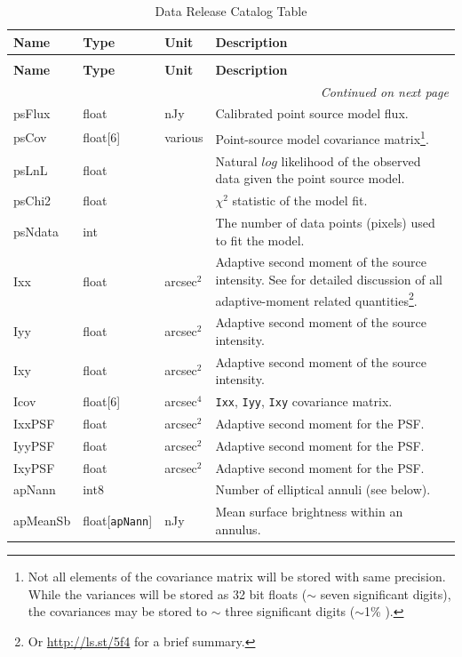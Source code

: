 \documentclass[SE,lsstdraft,toc]{lsstdoc}
\newenvironment{schema}[3]{%
\setlength\LTleft{0pt}
\setlength\LTright{\fill}
\begin{longtable}{p{0.2\textwidth}p{0.14\textwidth}p{0.14\textwidth}p{0.41\textwidth}}

\caption[#1]{#2\label{#3}}\\

\hline \textbf{Name} & \textbf{Type} & \textbf{Unit} & \textbf{Description}\\ \hline
\endfirsthead

\caption[#1]{#2}\\

\hline \textbf{Name} & \textbf{Type} & \textbf{Unit} & \textbf{Description}\\ \hline
\endhead

\hline \multicolumn{4}{r}{\emph{Continued on next page}} \\
\endfoot

\hline\hline
\endlastfoot
}{%
\hline
\end{longtable}
}
\begin{document}
\begin{schema}{\Source Table}{Data Release Catalog \Source Table}{tbl:sourceTable}
psFlux & float & nJy & Calibrated point source model flux.\\

psCov & float[6] & various & Point-source model covariance matrix\footnote{Not all elements of the covariance matrix will be stored with same precision. While the variances will be stored as 32 bit floats ($\sim$ seven significant digits), the covariances may be stored to $\sim$ three significant digits ($\sim$1\% ).}. \\

psLnL & float & ~ & Natural $log$ likelihood of the observed data given the point source model. \\

psChi2 & float & ~ & $\chi^2$ statistic of the model fit. \\

psNdata & int & ~ & The number of data points (pixels) used to fit the model. \\

Ixx & float & arcsec$^{2}$ & Adaptive second moment of the source intensity. See \citet{2002AJ....123..583B} for detailed discussion of all adaptive-moment related quantities\footnote{Or \url{http://ls.st/5f4} for a brief summary.}. \\

Iyy & float & arcsec$^{2}$ & Adaptive second moment of the source intensity. \\

Ixy & float & arcsec$^{2}$ & Adaptive second moment of the source intensity. \\

Icov & float[6] & arcsec$^{4}$ & \texttt{Ixx}, \texttt{Iyy}, \texttt{Ixy} covariance matrix. \\

IxxPSF & float & arcsec$^{2}$ & Adaptive second moment for the PSF. \\

IyyPSF & float & arcsec$^{2}$ & Adaptive second moment for the PSF. \\

IxyPSF & float & arcsec$^{2}$ & Adaptive second moment for the PSF. \\

apNann & int8 & ~ & Number of elliptical annuli (see below). \\

apMeanSb & float[\texttt{apNann}] & nJy & Mean surface brightness within an annulus. \\


\end{schema}
\end{document}
